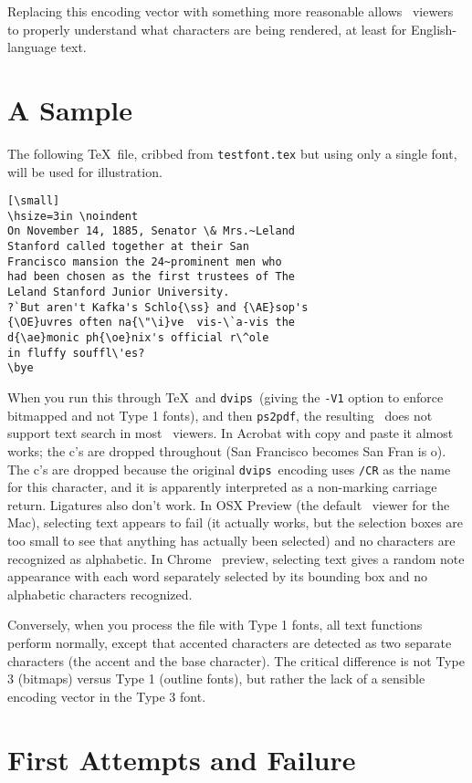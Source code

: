 \documentclass{ltugboat}
\def\PDF{\acro{PDF}}
\def\dvips{\texttt{dvips}}
\def\ps2pdf{\texttt{ps2pdf}}
\begin{document}
Replacing this encoding vector with something more
reasonable allows \PDF\ viewers to properly understand what
characters are being rendered, at least for English-language text.

\section{A Sample}

The following \TeX\ file, cribbed from \texttt{testfont.tex}
but using only a single font, will be used for illustration.

\begin{verbatim}[\small]
\hsize=3in \noindent
On November 14, 1885, Senator \& Mrs.~Leland
Stanford called together at their San
Francisco mansion the 24~prominent men who
had been chosen as the first trustees of The
Leland Stanford Junior University.
?`But aren't Kafka's Schlo{\ss} and {\AE}sop's
{\OE}uvres often na{\"\i}ve  vis-\`a-vis the
d{\ae}monic ph{\oe}nix's official r\^ole
in fluffy souffl\'es?
\bye
\end{verbatim}
\noindent
When you run this through \TeX\ and \dvips\
(giving the \texttt{-V1} option to enforce bitmapped
and not Type 1 fonts), and then \ps2pdf,
the resulting \PDF\ does not
support text search in most \PDF\ viewers.  In Acrobat
with copy and paste it almost works;
the c's are dropped throughout (San Francisco becomes
San Fran is o).  The c's are dropped because the
original \dvips\ encoding uses \texttt{/CR} as the
name for this character, and it is apparently
interpreted as a non-marking carriage return.
Ligatures also don't work.  In OSX
Preview (the default \PDF\ viewer for the Mac),
selecting text appears to fail (it
actually works, but the selection boxes are too small
to see that anything has actually been selected) and
no characters are recognized as alphabetic.  In Chrome
\PDF\ preview, selecting text gives a random note
appearance with each word separately selected by its
bounding box and no alphabetic characters recognized.

Conversely, when you process the file with Type 1
fonts, all text functions perform normally, except that
accented characters are detected as two separate
characters (the accent and the base character).  The
critical difference is not Type 3 (bitmaps) versus
Type 1 (outline fonts), but rather the lack of a
sensible encoding vector in the Type 3 font.

\section{First Attempts and Failure}
\end{document}
